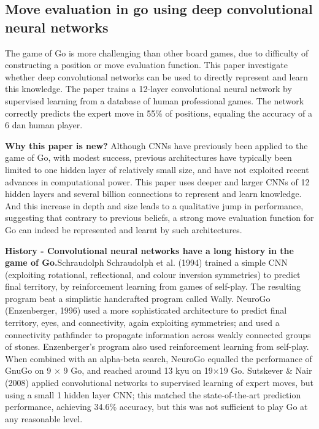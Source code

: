 \subsection{Move evaluation in go using deep convolutional neural networks}
The game of Go is more challenging than other board games, due to difficulty of constructing a position or move evaluation function. This paper investigate whether deep convolutional networks can be used to directly represent and learn this knowledge. The paper trains a 12-layer convolutional neural network by supervised learning from a database of human professional games. The network correctly predicts the expert move in 55\% of positions, equaling the accuracy of a 6 dan human player.

\textbf{Why this paper is new?} Although CNNs have previously been applied to the game of Go, with modest success, previous architectures have typically been limited to one hidden layer of relatively small size, and have not exploited recent advances in computational power. This paper uses deeper and larger CNNs of 12 hidden layers and several billion connections to represent and learn knowledge. And this increase in depth and size leads to a qualitative jump in performance, suggesting that contrary to previous beliefs, a strong move evaluation function for Go can indeed be represented and learnt by such architectures.

\textbf{History - Convolutional neural networks have a long history in the game of Go.}Schraudolph Schraudolph
et al. (1994) trained a simple CNN (exploiting rotational, reflectional, and colour inversion symmetries)
to predict final territory, by reinforcement learning from games of self-play. The resulting
program beat a simplistic handcrafted program called Wally. NeuroGo (Enzenberger, 1996) used
a more sophisticated architecture to predict final territory, eyes, and connectivity, again exploiting
symmetries; and used a connectivity pathfinder to propagate information across weakly connected
groups of stones. Enzenberger’s program also used reinforcement learning from self-play. When
combined with an alpha-beta search, NeuroGo equalled the performance of GnuGo on 9 $\times$ 9 Go,
and reached around 13 kyu on 19$\times$19 Go. Sutskever \& Nair (2008) applied convolutional networks
to supervised learning of expert moves, but using a small 1 hidden layer CNN; this matched
the state-of-the-art prediction performance, achieving 34.6\% accuracy, but this was not sufficient to
play Go at any reasonable level.


